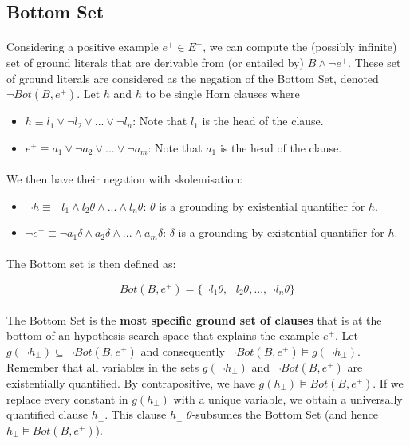 \documentclass{article}
\theoremstyle{plain}
\theoremstyle{definition}
\begin{document}
\begin{multicols}{2}
\subsection{Bottom Set}

\paragraph{} Considering a positive example $e^+ \in E^+$, we can compute the (possibly infinite) set of ground literals that are derivable from (or entailed by) $B \land \lnot e^+$. These set of ground literals are considered as the negation of the Bottom Set, denoted $\lnot Bot(B, e^+)$. Let $h$ and $h$ to be single Horn clauses where

\begin{itemize}
\item $h \equiv l_1 \lor \lnot l_2 \lor ... \lor \lnot l_n$: Note that $l_1$ is the head of the clause.
\item $e^+ \equiv a_1 \lor \lnot a_2 \lor ... \lor \lnot a_m$: Note that $a_1$ is the head of the clause.
\end{itemize}

\paragraph{} We then have their negation with skolemisation:

\begin{itemize}
\item $\lnot h \equiv \lnot l_1 \land l_2\theta \land ... \land l_n\theta$: $\theta$ is a grounding by existential quantifier for $h$.
\item $\lnot e^+ \equiv \lnot a_1\delta \land a_2\delta \land ... \land a_m\delta$: $\delta$ is a grounding by existential quantifier for $h$.
\end{itemize}

\paragraph{} The Bottom set is then defined as:

$$Bot(B, e^+) = \{\lnot l_1\theta, \lnot l_2\theta, ..., \lnot l_n\theta\}$$

\paragraph{} The Bottom Set is the \textbf{most specific ground set of clauses} that is at the bottom of an hypothesis search space that explains the example $e^+$. Let $g(\lnot h_{\perp}) \subseteq \lnot Bot(B, e^+)$ and consequently $\lnot Bot(B, e^+) \models g(\lnot h_{\perp})$. Remember that all variables in the sets $g(\lnot h_{\perp})$ and $\lnot Bot(B, e^+)$ are existentially quantified. By contrapositive, we have $g(h_{\perp}) \models Bot(B, e^+)$. If we replace every constant in $g(h_{\perp})$ with a unique variable, we obtain a universally quantified clause $h_{\perp}$. This clause $h_{\perp}$ $\theta$-subsumes the Bottom Set (and hence $h_{\perp} \models Bot(B, e^+)$).


\end{multicols}
\end{document}
